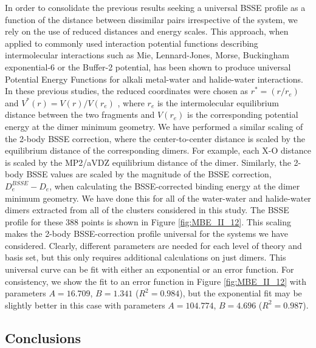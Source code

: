 \documentclass[11pt, proquest]{uwthesis}[2020/02/24]
\let\ce\ch
\begin{document}
\par In order to consolidate the previous results seeking a universal BSSE profile as a function of the distance between dissimilar pairs irrespective of the system, we rely on the use of reduced distances and energy scales. This approach, when applied to commonly used interaction potential functions describing intermolecular interactions such as Mie, Lennard-Jones, Morse, Buckingham exponential-6 or the Buffer-2 potential, has been shown to produce universal Potential Energy Functions for alkali metal-water and halide-water interactions.\autocite{werhahn_universal_2014,werhahn_new_2015,xantheas_universal_2014}  In these previous studies, the reduced coordinates were chosen as $r^*=(r/r_e)$ and $V^*(r)=V(r)/V(r_e)$ , where $r_e$ is the intermolecular equilibrium distance between the two fragments and $V(r_e)$ is the corresponding potential energy at the dimer minimum geometry. We have performed a similar scaling of the 2-body BSSE correction, where the center-to-center distance is scaled by the equilibrium distance of the corresponding dimers. For example, each X-O distance is scaled by the MP2/aVDZ equilibrium distance of the \ce{X^-(H2O)} dimer. Similarly, the 2-body BSSE values are scaled by the magnitude of the BSSE correction, $D_e^{BSSE}-D_e$, when calculating the BSSE-corrected binding energy at the dimer minimum geometry. We have done this for all of the water-water and halide-water dimers extracted from all of the clusters considered in this study. The BSSE profile for these 388 points is shown in Figure \ref{fig:MBE_II_12}. This scaling makes the 2-body BSSE-correction profile universal for the systems we have considered. Clearly, different parameters are needed for each level of theory and basis set, but this only requires additional calculations on just dimers. This universal curve can be fit with either an exponential or an error function. For consistency, we show the fit to an error function in Figure \ref{fig:MBE_II_12} with parameters $A = 16.709$, $B = 1.341$ ($R^2 = 0.984$), but the exponential fit may be slightly better in this case with parameters $A = 104.774$, $B = 4.696$ ($R^2 = 0.987$).

\subsection{Conclusions} \label{sec:MBE_2_sec_4}
\end{document}
